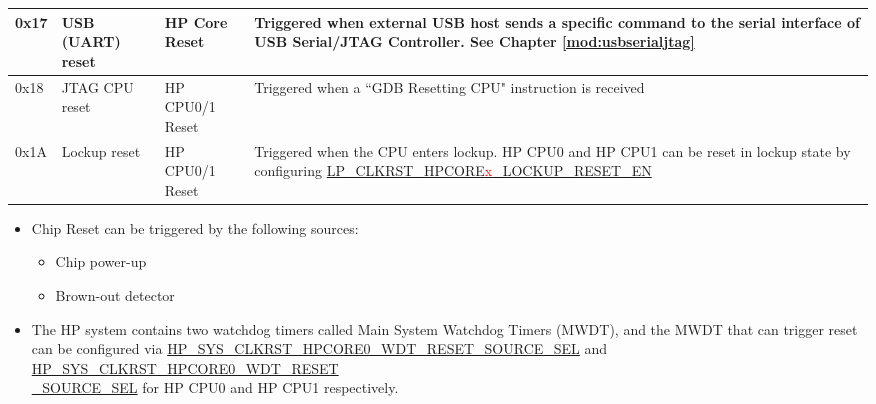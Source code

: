 \documentclass[main\_\_EN.tex]{subfiles}
\begin{document}
\begin{longtable}[c]{ |l|m{3.5cm}|m{2.7cm}|m{8.7cm}| }
        0x17 & USB (UART) reset & HP Core Reset & Triggered when external USB host sends a specific command to the serial interface of USB Serial/JTAG Controller. See Chapter \ref{mod:usbserialjtag} \textit{\nameref{mod:usbserialjtag}} \\\hline
        0x18 & JTAG CPU reset & HP CPU0/1 Reset & Triggered when a ``GDB Resetting CPU" instruction is received
        \\\hline
        0x1A & Lockup reset & HP CPU0/1 Reset & Triggered when the CPU enters lockup. HP CPU0 and HP CPU1 can be reset in lockup state by configuring \hyperref[fielddesc:LPCLKRSTHPCORE0LOCKUPRESETEN]{LP\_CLKRST\_HPCORE\textcolor{red}{x}\_LOCKUP\_RESET\_EN} \\\hline
\end{longtable}

\begin{itemize}
    \item Chip Reset can be triggered by the following sources:
    \begin{itemize}
        \item Chip power-up
        \item Brown-out detector
    \end{itemize}
    \item The HP system contains two watchdog timers called Main System Watchdog Timers (MWDT), and the MWDT that can trigger reset can be configured via \hyperref[fielddesc:HPSYSCLKRSTHPCORE0WDTRESETSOURCESEL]{HP\_SYS\_CLKRST\_HPCORE0\_WDT\_RESET\_SOURCE\_SEL} and \hyperref[fielddesc:HPSYSCLKRSTHPCORE1WDTRESETSOURCESEL]{HP\_SYS\_CLKRST\_HPCORE0\_WDT\_RESET\\\_SOURCE\_SEL} for HP CPU0 and HP CPU1 respectively.
\end{itemize}
\end{document}
